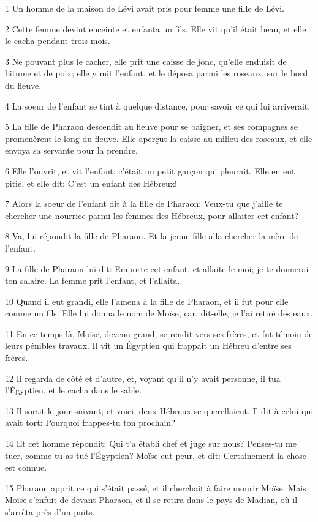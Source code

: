 \par 1 Un homme de la maison de Lévi avait pris pour femme une fille de Lévi.
\par 2 Cette femme devint enceinte et enfanta un fils. Elle vit qu'il était beau, et elle le cacha pendant trois mois.
\par 3 Ne pouvant plus le cacher, elle prit une caisse de jonc, qu'elle enduisit de bitume et de poix; elle y mit l'enfant, et le déposa parmi les roseaux, sur le bord du fleuve.
\par 4 La soeur de l'enfant se tint à quelque distance, pour savoir ce qui lui arriverait.
\par 5 La fille de Pharaon descendit au fleuve pour se baigner, et ses compagnes se promenèrent le long du fleuve. Elle aperçut la caisse au milieu des roseaux, et elle envoya sa servante pour la prendre.
\par 6 Elle l'ouvrit, et vit l'enfant: c'était un petit garçon qui pleurait. Elle en eut pitié, et elle dit: C'est un enfant des Hébreux!
\par 7 Alors la soeur de l'enfant dit à la fille de Pharaon: Veux-tu que j'aille te chercher une nourrice parmi les femmes des Hébreux, pour allaiter cet enfant?
\par 8 Va, lui répondit la fille de Pharaon. Et la jeune fille alla chercher la mère de l'enfant.
\par 9 La fille de Pharaon lui dit: Emporte cet enfant, et allaite-le-moi; je te donnerai ton salaire. La femme prit l'enfant, et l'allaita.
\par 10 Quand il eut grandi, elle l'amena à la fille de Pharaon, et il fut pour elle comme un fils. Elle lui donna le nom de Moïse, car, dit-elle, je l'ai retiré des eaux.
\par 11 En ce temps-là, Moïse, devenu grand, se rendit vers ses frères, et fut témoin de leurs pénibles travaux. Il vit un Égyptien qui frappait un Hébreu d'entre ses frères.
\par 12 Il regarda de côté et d'autre, et, voyant qu'il n'y avait personne, il tua l'Égyptien, et le cacha dans le sable.
\par 13 Il sortit le jour suivant; et voici, deux Hébreux se querellaient. Il dit à celui qui avait tort: Pourquoi frappes-tu ton prochain?
\par 14 Et cet homme répondit: Qui t'a établi chef et juge sur nous? Penses-tu me tuer, comme tu as tué l'Égyptien? Moïse eut peur, et dit: Certainement la chose est connue.
\par 15 Pharaon apprit ce qui s'était passé, et il cherchait à faire mourir Moïse. Mais Moïse s'enfuit de devant Pharaon, et il se retira dans le pays de Madian, où il s'arrêta près d'un puits.
